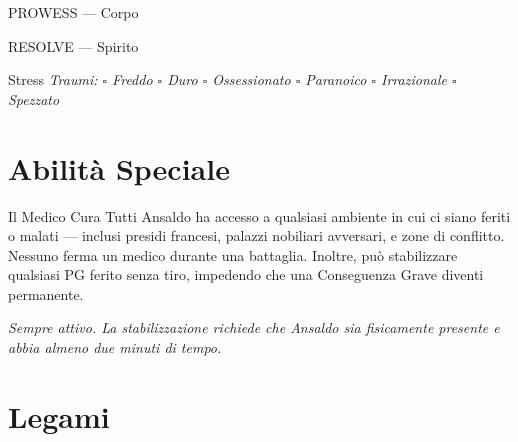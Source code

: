 \begin{attributoblock}[FieschiGreen]{PROWESS — Corpo}
\end{attributoblock}


\begin{attributoblock}[FieschiGreen]{RESOLVE — Spirito}
  \end{attributoblock}

\medskip
\begin{pgclockbox}{Stress \hfill {}}
  \small\textit{Traumi: $\square$ Freddo \quad $\square$ Duro \quad $\square$ Ossessionato \quad $\square$ Paranoico \quad $\square$ Irrazionale \quad $\square$ Spezzato}
\end{pgclockbox}

\section*{Abilità Speciale}

\begin{fieschibox}{Il Medico Cura Tutti}
  Ansaldo ha accesso a qualsiasi ambiente in cui ci siano feriti o malati —
  inclusi presidi francesi, palazzi nobiliari avversari, e zone di conflitto.
  Nessuno ferma un medico durante una battaglia.
  Inoltre, può stabilizzare qualsiasi PG ferito senza tiro, impedendo
  che una Conseguenza Grave diventi permanente.

  \medskip\noindent\textit{Sempre attivo. La stabilizzazione richiede
  che Ansaldo sia fisicamente presente e abbia almeno due minuti di tempo.}
\end{fieschibox}

\section*{Legami}

